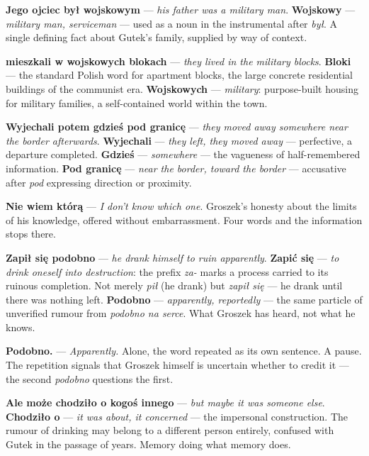 
\textbf{Jego ojciec był wojskowym} --- \textit{his father was a
military man}. \textbf{Wojskowy} --- \textit{military man,
serviceman} --- used as a noun in the instrumental after
\textit{był}. A single defining fact about Gutek's family,
supplied by way of context.

\textbf{mieszkali w wojskowych blokach} --- \textit{they lived
in the military blocks}. \textbf{Bloki} --- the standard Polish
word for apartment blocks, the large concrete residential
buildings of the communist era. \textbf{Wojskowych} ---
\textit{military}: purpose-built housing for military families,
a self-contained world within the town.

\textbf{Wyjechali potem gdzieś pod granicę} --- \textit{they
moved away somewhere near the border afterwards}.
\textbf{Wyjechali} --- \textit{they left, they moved away} ---
perfective, a departure completed. \textbf{Gdzieś} ---
\textit{somewhere} --- the vagueness of half-remembered
information. \textbf{Pod granicę} --- \textit{near the border,
toward the border} --- accusative after \textit{pod} expressing
direction or proximity.

\textbf{Nie wiem którą} --- \textit{I don't know which one}.
Groszek's honesty about the limits of his knowledge, offered
without embarrassment. Four words and the information stops
there.

\textbf{Zapił się podobno} --- \textit{he drank himself to ruin
apparently}. \textbf{Zapić się} --- \textit{to drink oneself
into destruction}: the prefix \textit{za-} marks a process
carried to its ruinous completion. Not merely \textit{pił} (he
drank) but \textit{zapił się} --- he drank until there was
nothing left. \textbf{Podobno} --- \textit{apparently,
reportedly} --- the same particle of unverified rumour from
\textit{podobno na serce}. What Groszek has heard, not what he
knows.

\textbf{Podobno.} --- \textit{Apparently.} Alone, the word
repeated as its own sentence. A pause. The repetition signals
that Groszek himself is uncertain whether to credit it --- the
second \textit{podobno} questions the first.

\textbf{Ale może chodziło o kogoś innego} --- \textit{but maybe
it was someone else}. \textbf{Chodziło o} --- \textit{it was
about, it concerned} --- the impersonal construction. The rumour
of drinking may belong to a different person entirely, confused
with Gutek in the passage of years. Memory doing what memory
does.

